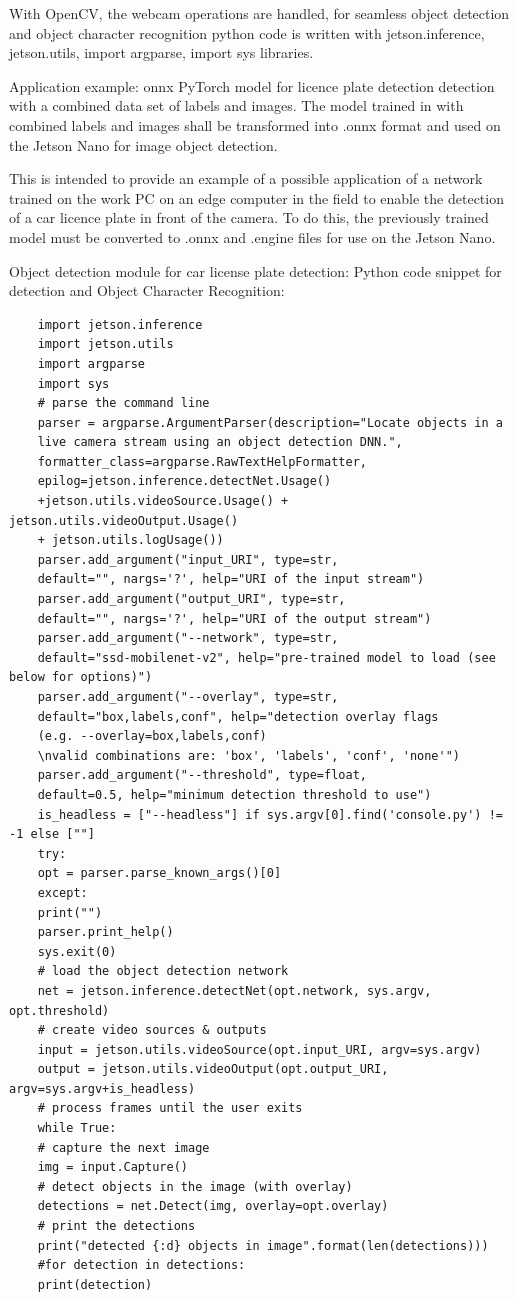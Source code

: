 With OpenCV, the webcam operations are handled, for seamless object detection and object character recognition python code is written with jetson.inference, jetson.utils, import argparse, import sys libraries.

Application example: onnx PyTorch model for licence plate detection  detection with a combined data set of labels and images. The model trained in with combined labels and images shall be transformed into .onnx format and used on the Jetson Nano for image object detection.

This is intended to provide an example of a possible application of a network trained on the work PC on an edge computer in the field to enable the detection of a car licence plate in front of the camera. To do this, the previously trained model must be converted to .onnx and .engine files for use on the Jetson Nano.

Object detection module for car license plate detection:
Python code snippet for detection and Object Character Recognition:
\begin{lstlisting}
	import jetson.inference
	import jetson.utils
	import argparse
	import sys
	# parse the command line
	parser = argparse.ArgumentParser(description="Locate objects in a
	live camera stream using an object detection DNN.", 
	formatter_class=argparse.RawTextHelpFormatter,
	epilog=jetson.inference.detectNet.Usage()
	+jetson.utils.videoSource.Usage() + jetson.utils.videoOutput.Usage() 
	+ jetson.utils.logUsage())
	parser.add_argument("input_URI", type=str, 
	default="", nargs='?', help="URI of the input stream")
	parser.add_argument("output_URI", type=str, 
	default="", nargs='?', help="URI of the output stream")
	parser.add_argument("--network", type=str,
	default="ssd-mobilenet-v2", help="pre-trained model to load (see below for options)")
	parser.add_argument("--overlay", type=str, 
	default="box,labels,conf", help="detection overlay flags 
	(e.g. --overlay=box,labels,conf)
	\nvalid combinations are: 'box', 'labels', 'conf', 'none'")
	parser.add_argument("--threshold", type=float, 
	default=0.5, help="minimum detection threshold to use") 
	is_headless = ["--headless"] if sys.argv[0].find('console.py') != -1 else [""]
	try:
	opt = parser.parse_known_args()[0]
	except:
	print("")
	parser.print_help()
	sys.exit(0)
	# load the object detection network
	net = jetson.inference.detectNet(opt.network, sys.argv, opt.threshold)
	# create video sources & outputs
	input = jetson.utils.videoSource(opt.input_URI, argv=sys.argv)
	output = jetson.utils.videoOutput(opt.output_URI, argv=sys.argv+is_headless)
	# process frames until the user exits
	while True:
	# capture the next image
	img = input.Capture()
	# detect objects in the image (with overlay)
	detections = net.Detect(img, overlay=opt.overlay)
	# print the detections
	print("detected {:d} objects in image".format(len(detections)))
	#for detection in detections:
	print(detection)
\end{lstlisting}

